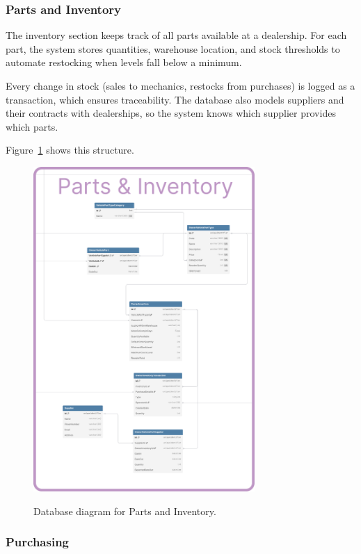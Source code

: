 \subsubsection{Parts and Inventory} 


The inventory section keeps track of all parts available at a dealership. For each part, the system stores quantities, warehouse location, and stock thresholds to automate restocking when levels fall below a minimum.

Every change in stock (sales to mechanics, restocks from purchases) is logged as a transaction, which ensures traceability. The database also models suppliers and their contracts with dealerships, so the system knows which supplier provides which parts.

Figure~\ref{fig:dbParts} shows this structure.

\begin{figure}[h]
  \caption{Database diagram for Parts and Inventory.}
  \centering
  \includegraphics[width=0.75\textwidth]{figs/dbDiagrams/Parts_and_Inventory}
  \label{fig:dbParts}
\end{figure}


\subsubsection{Purchasing} 


